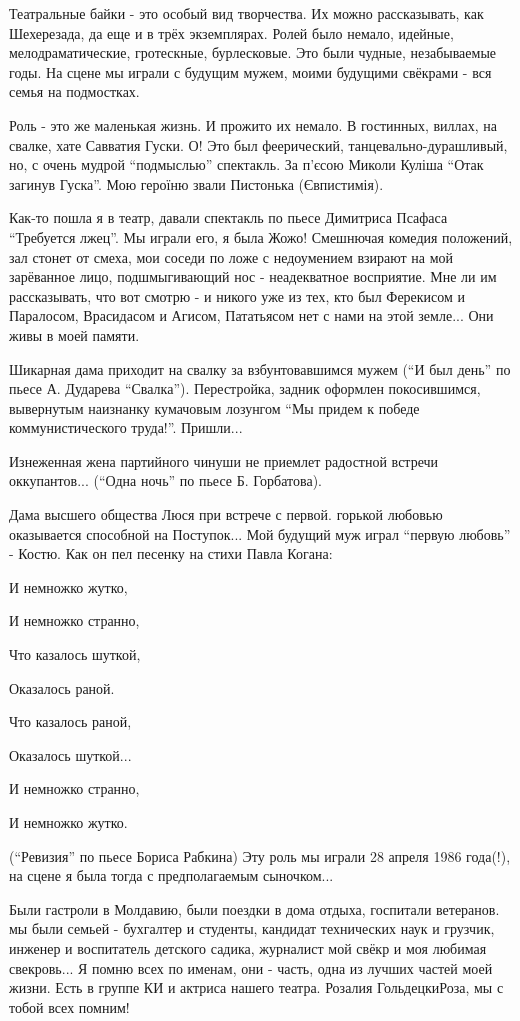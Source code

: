 Театральные байки - это особый вид творчества. Их можно рассказывать, как
Шехерезада, да еще и в трёх экземплярах. Ролей было немало, идейные,
мелодраматические, гротескные, бурлесковые. Это были чудные, незабываемые
годы. На сцене мы играли с будущим мужем, моими будущими свёкрами - вся семья
на подмостках.

Роль - это же маленькая жизнь. И прожито их немало. В гостинных, виллах, на
свалке, хате Савватия Гуски. О! Это был феерический, танцевально-дурашливый,
но, с очень мудрой \enquote{подмыслью} спектакль. За п'єсою Миколи Куліша \enquote{Отак загинув
Гуска}.   Мою героїню звали Пистонька (Євпистимія).

Как-то пошла я в театр, давали спектакль по пьесе Димитриса Псафаса
\enquote{Требуется лжец}. Мы играли его, я была Жожо! Смешнючая комедия
положений, зал стонет от смеха, мои соседи по ложе с недоумением взирают на мой
зарёванное лицо, подшмыгивающий нос - неадекватное восприятие. Мне ли им
рассказывать, что вот смотрю - и никого уже из тех, кто был Ферекисом и
Паралосом, Врасидасом и Агисом, Пататьясом нет с нами на этой земле... Они живы
в моей памяти.

Шикарная дама приходит на свалку за взбунтовавшимся мужем (\enquote{И был день} по
пьесе А. Дударева \enquote{Свалка}). Перестройка, задник оформлен покосившимся,
вывернутым наизнанку  кумачовым лозунгом \enquote{Мы придем к победе коммунистического
труда!}. Пришли...

Изнеженная жена партийного чинуши не приемлет радостной встречи оккупантов...
(\enquote{Одна ночь} по пьесе Б. Горбатова).

Дама высшего общества  Люся при встрече с первой. горькой любовью оказывается
способной на Поступок... Мой будущий  муж играл \enquote{первую любовь} -
Костю.  Как он пел песенку на стихи Павла Когана:

И немножко жутко, 

И немножко странно, 

Что казалось шуткой, 

Оказалось раной. 

Что казалось раной, 

Оказалось шуткой... 

И немножко странно, 

И немножко жутко. 

(\enquote{Ревизия} по пьесе Бориса Рабкина) Эту роль мы играли 28 апреля 1986 года(!),
на сцене я была тогда с предполагаемым сыночком...

Были гастроли в Молдавию, были поездки в дома отдыха, госпитали ветеранов. мы
были семьей - бухгалтер и студенты, кандидат технических наук и грузчик,
инженер и воспитатель детского садика, журналист мой свёкр и моя любимая
свекровь... Я помню всех по именам, они - часть, одна из лучших частей моей
жизни. Есть в группе КИ  и актриса нашего театра.  Розалия ГольдецкиРоза, мы с
тобой всех помним! 


